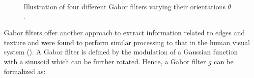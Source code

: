\begin{enumerate}[leftmargin=*]
\begin{figure}
	\hspace*{\fill}
	 \hfill
	 \hfill
	 \hfill
	\hspace*{\fill}
	\caption{Illustration of four different Gabor filters varying their orientations $\theta$.}
	\label{fig:gabor}
\end{figure}

Gabor filters offer another approach to extract information related to edges and texture and were found to perform similar processing to that in the human visual system (\cite{Gabor1946,Daugman1985}). A Gabor filter is defined by the modulation of a Gaussian function with a sinusoid which can be further rotated. Hence, a Gabor filter $g$ can be formalized as:


\end{enumerate}
